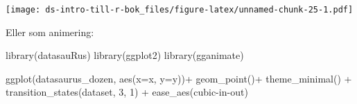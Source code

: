 \documentclass[
]{book}
\newenvironment{Shaded}{\begin{snugshade}}{\end{snugshade}}
\newcommand{\AttributeTok}[1]{\textcolor[rgb]{0.77,0.63,0.00}{#1}}
\newcommand{\DecValTok}[1]{\textcolor[rgb]{0.00,0.00,0.81}{#1}}
\newcommand{\FunctionTok}[1]{\textcolor[rgb]{0.00,0.00,0.00}{#1}}
\newcommand{\NormalTok}[1]{#1}
\newcommand{\SpecialCharTok}[1]{\textcolor[rgb]{0.00,0.00,0.00}{#1}}
\newcommand{\StringTok}[1]{\textcolor[rgb]{0.31,0.60,0.02}{#1}}
\begin{document}
\texttt{[image: ds-intro-till-r-bok\_files/figure-latex/unnamed-chunk-25-1.pdf]}

Eller som animering:

\begin{Shaded}
\begin{Highlighting}[]
\FunctionTok{library}\NormalTok{(datasauRus)}
\FunctionTok{library}\NormalTok{(ggplot2)}
\FunctionTok{library}\NormalTok{(gganimate)}

\FunctionTok{ggplot}\NormalTok{(datasaurus\_dozen, }\FunctionTok{aes}\NormalTok{(}\AttributeTok{x=}\NormalTok{x, }\AttributeTok{y=}\NormalTok{y))}\SpecialCharTok{+}
  \FunctionTok{geom\_point}\NormalTok{()}\SpecialCharTok{+}
  \FunctionTok{theme\_minimal}\NormalTok{() }\SpecialCharTok{+}
  \FunctionTok{transition\_states}\NormalTok{(dataset, }\DecValTok{3}\NormalTok{, }\DecValTok{1}\NormalTok{) }\SpecialCharTok{+} 
  \FunctionTok{ease\_aes}\NormalTok{(}\StringTok{\textquotesingle{}cubic{-}in{-}out\textquotesingle{}}\NormalTok{)}
\end{Highlighting}
\end{Shaded}
\end{document}
